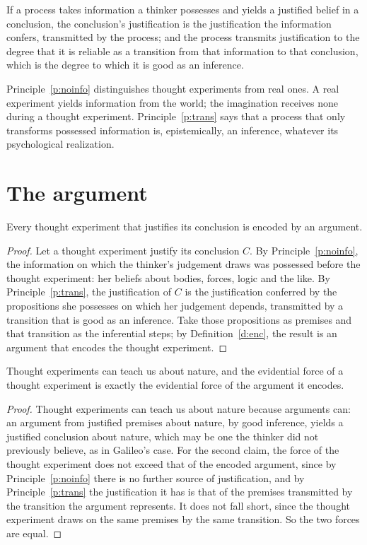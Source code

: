 \documentclass{situationist-preprint}
\begin{document}
\begin{principle}[Transformation]\label{p:trans}
If a process takes information a thinker possesses and yields a justified belief in a conclusion, the conclusion's justification is the justification the information confers, transmitted by the process; and the process transmits justification to the degree that it is reliable as a transition from that information to that conclusion, which is the degree to which it is good as an inference.
\end{principle}

Principle~\ref{p:noinfo} distinguishes thought experiments from real ones. A real experiment yields information from the world; the imagination receives none during a thought experiment. Principle~\ref{p:trans} says that a process that only transforms possessed information is, epistemically, an inference, whatever its psychological realization.

\section{The argument}

\begin{proposition}\label{p:encode}
Every thought experiment that justifies its conclusion is encoded by an argument.
\end{proposition}

\begin{proof}
Let a thought experiment justify its conclusion $C$. By Principle~\ref{p:noinfo}, the information on which the thinker's judgement draws was possessed before the thought experiment: her beliefs about bodies, forces, logic and the like. By Principle~\ref{p:trans}, the justification of $C$ is the justification conferred by the propositions she possesses on which her judgement depends, transmitted by a transition that is good as an inference. Take those propositions as premises and that transition as the inferential steps; by Definition~\ref{d:enc}, the result is an argument that encodes the thought experiment.
\end{proof}

\begin{theorem}\label{t:main}
Thought experiments can teach us about nature, and the evidential force of a thought experiment is exactly the evidential force of the argument it encodes.
\end{theorem}

\begin{proof}
Thought experiments can teach us about nature because arguments can: an argument from justified premises about nature, by good inference, yields a justified conclusion about nature, which may be one the thinker did not previously believe, as in Galileo's case. For the second claim, the force of the thought experiment does not exceed that of the encoded argument, since by Principle~\ref{p:noinfo} there is no further source of justification, and by Principle~\ref{p:trans} the justification it has is that of the premises transmitted by the transition the argument represents. It does not fall short, since the thought experiment draws on the same premises by the same transition. So the two forces are equal.
\end{proof}
\end{document}
